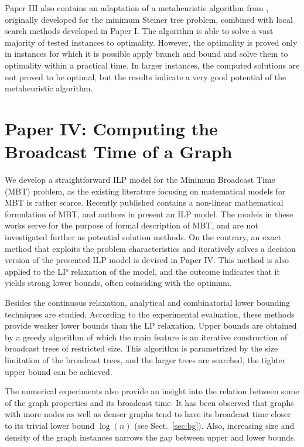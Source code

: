 Paper III also contains an adaptation of a metaheuristic algorithm from \cite{pajor18}, originally developed for the minimum Steiner tree problem, 
combined with local search methods developed in Paper I.
The algorithm is able to solve a vast majority of tested instances to optimality. 
However, the optimality is proved only in instances for which it is possible apply branch and bound and solve them to optimality within a practical time.
In larger instances, the computed solutions are not proved to be optimal, but the results indicate a very good potential of the metaheuristic algorithm. 
%
%

\section{Paper IV: Computing the Broadcast Time of a Graph}

We develop a straightforward ILP model for the Minimum Broadcast Time (MBT) problem, as the existing literature focusing on matematical models for MBT is rather scarce. 
Recently published \cite{chu17} contains a non-linear mathematical formulation of MBT, and authors in \cite{desousa18} present an ILP model.
The models in these works serve for the purpose of formal description of MBT, and are not investigated further as potential solution methods.
On the contrary, an exact method that exploits the problem characteristics and iteratively solves a decision version of the presented ILP model is devised in Paper IV.
This method is also applied to the LP relaxation of the model, and the outcome indicates that it yields strong lower bounds, often coinciding with the optimum.

Besides the continuous relaxation, analytical and combinatorial lower bounding techniques are studied. 
According to the experimental evaluation, these methods provide weaker lower bounds than the LP relaxation.
Upper bounds are obtained by a greedy algorithm of which the main feature is an iterative construction of broadcast trees of restricted size.
This algorithm is parametrized by the size limitation of the broadcast trees, and the larger trees are searched, the tighter upper bound can be achieved.

The numerical experiments also provide an insight into the relation between some of the graph properties and its broadcast time. 
It has been observed that graphs with more nodes as well as denser graphs tend to have its broadcast time closer to its trivial lower bound $\log(n)$ (see Sect.~\ref{sec:bg}).
Also, increasing size and density of the graph instances narrows the gap between upper and lower bounds.


